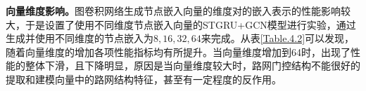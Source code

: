 \documentclass[master]{thesis-uestc}
\begin{document}
\textbf{向量维度影响。}图卷积网络生成节点嵌入向量的维度对的嵌入表示的性能影响较大，于是设置了使用不同维度节点嵌入向量的STGRU+GCN模型进行实验，通过生成并使用不同维度的节点嵌入为$8,16,32,64$来完成。从表\ref{Table.4.2}可以发现，随着向量维度的增加各项性能指标均有所提升。当向量维度增加到64时，出现了性能的整体下滑，且下降明显，原因是当向量维度较大时，路网门控结构不能很好的提取和建模向量中的路网结构特征，甚至有一定程度的反作用。
\begin{table}[!ht]
\centering
\caption{使用不同维度节点嵌入向量的性能}
\label{Table.4.2}
\end{table}
\end{document}
